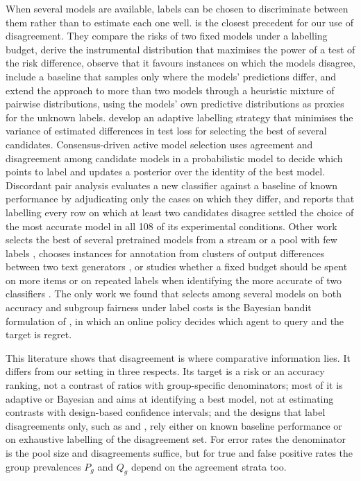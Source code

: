 When several models are available, labels can be chosen to discriminate between them rather than to estimate each one well. \citet{sawade2012active} is the closest precedent for our use of disagreement. They compare the risks of two fixed models under a labelling budget, derive the instrumental distribution that maximises the power of a test of the risk difference, observe that it favours instances on which the models disagree, include a baseline that samples only where the models' predictions differ, and extend the approach to more than two models through a heuristic mixture of pairwise distributions, using the models' own predictive distributions as proxies for the unknown labels. \citet{hara2024} develop an adaptive labelling strategy that minimises the variance of estimated differences in test loss for selecting the best of several candidates. Consensus-driven active model selection \citep{kay2025coda} uses agreement and disagreement among candidate models in a probabilistic model to decide which points to label and updates a posterior over the identity of the best model. Discordant pair analysis \citep{musgrove2023discordant} evaluates a new classifier against a baseline of known performance by adjudicating only the cases on which they differ, and \citet{kuboyama2026} reports that labelling every row on which at least two candidates disagree settled the choice of the most accurate model in all 108 of its experimental conditions. Other work selects the best of several pretrained models from a stream or a pool with few labels \citep{karimi2021,okanovic2025}, chooses instances for annotation from clusters of output differences between two text generators \citep{ashurytahan2024}, or studies whether a fixed budget should be spent on more items or on repeated labels when identifying the more accurate of two classifiers \citep{dorner2024}. The only work we found that selects among several models on both accuracy and subgroup fairness under label costs is the Bayesian bandit formulation of \citet{kher2026}, in which an online policy decides which agent to query and the target is regret.

This literature shows that disagreement is where comparative information lies. It differs from our setting in three respects. Its target is a risk or an accuracy ranking, not a contrast of ratios with group-specific denominators; most of it is adaptive or Bayesian and aims at identifying a best model, not at estimating contrasts with design-based confidence intervals; and the designs that label disagreements only, such as \citet{musgrove2023discordant} and \citet{kuboyama2026}, rely either on known baseline performance or on exhaustive labelling of the disagreement set. For error rates the denominator is the pool size and disagreements suffice, but for true and false positive rates the group prevalences $P_g$ and $Q_g$ depend on the agreement strata too.

